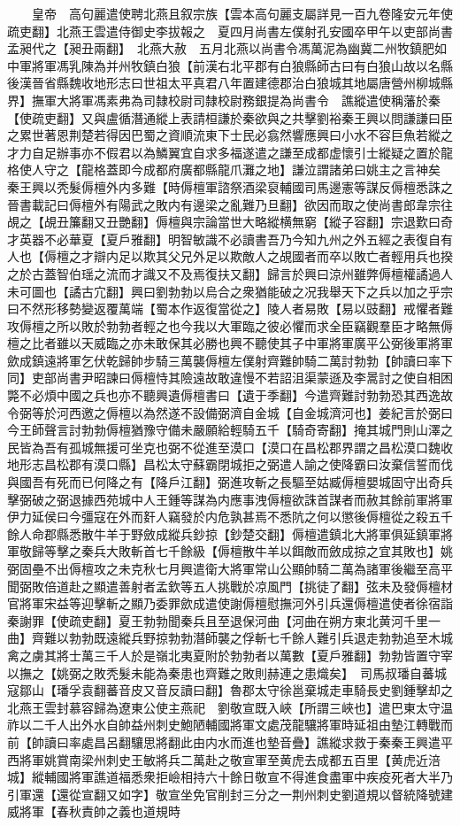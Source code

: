 　　皇帝　高句麗遣使聘北燕且叙宗族【雲本高句麗支屬詳見一百九卷隆安元年使疏吏翻】北燕王雲遣侍御史李拔報之　夏四月尚書左僕射孔安國卒甲午以吏部尚書孟昶代之【昶丑兩翻】　北燕大赦　五月北燕以尚書令馮萬泥為幽冀二州牧鎮肥如中軍將軍馮乳陳為并州牧鎮白狼【前漢右北平郡有白狼縣師古曰有白狼山故以名縣後漢晉省縣魏收地形志曰世祖太平真君八年置建德郡治白狼城其地屬唐營州柳城縣界】撫軍大將軍馮素弗為司隸校尉司隸校尉務銀提為尚書令　譙縱遣使稱藩於秦【使疏吏翻】又與盧循潛通縱上表請桓謙於秦欲與之共擊劉裕秦王興以問謙謙曰臣之累世著恩荆楚若得因巴蜀之資順流東下士民必翕然響應興曰小水不容巨魚若縱之才力自足辦事亦不假君以為鱗翼宜自求多福遂遣之謙至成都虚懷引士縱疑之置於龍格使人守之【龍格蓋即今成都府廣都縣龍爪灘之地】謙泣謂諸弟曰姚主之言神矣　秦王興以秃髮傉檀外内多難【時傉檀軍諮祭酒梁裒輔國司馬邊憲等謀反傉檀悉誅之晉書載記曰傉檀外有陽武之敗内有邊梁之亂難乃旦翻】欲因而取之使尚書郎韋宗往覘之【覘丑簾翻又丑艷翻】傉檀與宗論當世大略縱横無窮【縱子容翻】宗退歎曰奇才英器不必華夏【夏戶雅翻】明智敏識不必讀書吾乃今知九州之外五經之表復自有人也【傉檀之才辯内足以欺其父兄外足以欺敵人之覘國者而卒以敗亡者輕用兵也揆之於古蓋智伯瑶之流而才識又不及焉復扶又翻】歸言於興曰涼州雖弊傉檀權譎過人未可圖也【譎古宂翻】興曰劉勃勃以烏合之衆猶能破之况我舉天下之兵以加之乎宗曰不然形移勢變返覆萬端【蜀本作返復當從之】陵人者易敗【易以豉翻】戒懼者難攻傉檀之所以敗於勃勃者輕之也今我以大軍臨之彼必懼而求全臣竊觀羣臣才略無傉檀之比者雖以天威臨之亦未敢保其必勝也興不聽使其子中軍將軍廣平公弼後軍將軍歛成鎮遠將軍乞伏乾歸帥步騎三萬襲傉檀左僕射齊難帥騎二萬討勃勃【帥讀曰率下同】吏部尚書尹昭諫曰傉檀恃其險遠故敢違慢不若詔沮渠蒙遜及李暠討之使自相困斃不必煩中國之兵也亦不聽興遺傉檀書曰【遺于季翻】今遣齊難討勃勃恐其西逸故令弼等於河西邀之傉檀以為然遂不設備弼濟自金城【自金城濟河也】姜紀言於弼曰今王師聲言討勃勃傉檀猶豫守備未嚴願給輕騎五千【騎奇寄翻】掩其城門則山澤之民皆為吾有孤城無援可坐克也弼不從進至漠口【漠口在昌松郡界謂之昌松漠口魏收地形志昌松郡有漠口縣】昌松太守蘇霸閉城拒之弼遣人諭之使降霸曰汝棄信誓而伐與國吾有死而已何降之有【降戶江翻】弼進攻斬之長驅至姑臧傉檀嬰城固守出奇兵擊弼破之弼退據西苑城中人王鍾等謀為内應事洩傉檀欲誅首謀者而赦其餘前軍將軍伊力延侯曰今彊寇在外而姧人竊發於内危孰甚焉不悉阬之何以懲後傉檀從之殺五千餘人命郡縣悉散牛羊于野斂成縱兵鈔掠【鈔楚交翻】傉檀遣鎮北大將軍俱延鎮軍將軍敬歸等擊之秦兵大敗斬首七千餘級【傉檀散牛羊以餌敵而斂成掠之宜其敗也】姚弼固壘不出傉檀攻之未克秋七月興遣衛大將軍常山公顯帥騎二萬為諸軍後繼至高平聞弼敗倍道赴之顯遣善射者孟欽等五人挑戰於凉風門【挑徒了翻】弦未及發傉檀材官將軍宋益等迎擊斬之顯乃委罪歛成遣使謝傉檀慰撫河外引兵還傉檀遣使者徐宿詣秦謝罪【使疏吏翻】夏王勃勃聞秦兵且至退保河曲【河曲在朔方東北黄河千里一曲】齊難以勃勃既遠縱兵野掠勃勃潛師襲之俘斬七千餘人難引兵退走勃勃追至木城禽之虜其將士萬三千人於是嶺北夷夏附於勃勃者以萬數【夏戶雅翻】勃勃皆置守宰以撫之【姚弼之敗秃髮未能為秦患也齊難之敗則赫連之患熾矣】　司馬叔璠自蕃城寇鄒山【璠孚袁翻蕃音皮又音反讀曰翻】魯郡太守徐邕棄城走車騎長史劉鍾擊却之　北燕王雲封慕容歸為遼東公使主燕祀　劉敬宣既入峽【所謂三峽也】遣巴東太守温祚以二千人出外水自帥益州刺史鮑陋輔國將軍文處茂龍驤將軍時延祖由墊江轉戰而前【帥讀曰率處昌呂翻驤思將翻此由内水而進也墊音疊】譙縱求救于秦秦王興遣平西將軍姚賞南梁州刺史王敏將兵二萬赴之敬宣軍至黄虎去成都五百里【黄虎近涪城】縱輔國將軍譙道福悉衆拒嶮相持六十餘日敬宣不得進食盡軍中疾疫死者大半乃引軍還【還從宣翻又如字】敬宣坐免官削封三分之一荆州刺史劉道規以督統降號建威將軍【春秋責帥之義也道規時